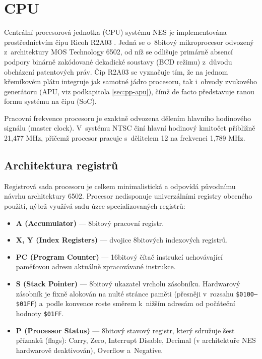 \section{CPU}

Centrální procesorová jednotka (CPU) systému NES je implementována prostřednictvím čipu Ricoh R2A03
. Jedná se o~8bitový mikroprocesor odvozený z~architektury MOS Technology 6502, od níž se odlišuje
primárně absencí podpory binárně zakódované dekadické soustavy (BCD režimu) z~důvodu obcházení
patentových práv. Čip R2A03 se vyznačuje tím, že na jednom křemíkovém plátu integruje jak samotné
jádro procesoru, tak i~obvody zvukového generátoru (APU, viz podkapitola \ref{sec:pp-apu}), čímž de
facto představuje ranou formu systému na čipu (SoC).

Pracovní frekvence procesoru je exaktně odvozena dělením hlavního hodinového signálu (master clock).
V~systému NTSC činí hlavní hodinový kmitočet přibližně 21,477 MHz, přičemž procesor pracuje
s~dělitelem 12 na frekvenci 1,789 MHz.

\subsection{Architektura registrů}

Registrová sada procesoru je celkem minimalistická a odpovídá původnímu návrhu architektury 6502.
Procesor nedisponuje univerzálními registry obecného použití, nýbrž využívá sadu úzce
specializovaných registrů:

\begin{itemize}
    \item \textbf{A (Accumulator)} — 8bitový pracovní registr.
    \item \textbf{X, Y (Index Registers)} — dvojice 8bitových indexových registrů.
    \item \textbf{PC (Program Counter)} — 16bitový čítač instrukcí uchovávající paměťovou adresu
        aktuálně zpracovávané instrukce.
    \item \textbf{S (Stack Pointer)} — 8bitový ukazatel vrcholu zásobníku. Hardwarový zásobník je
        fixně alokován na nulté stránce paměti (přesněji v~rozsahu \texttt{\$0100–\$01FF}) a~podle
        konvence roste směrem k~nižším adresám od počáteční hodnoty \texttt{\$01FF}.
    \item \textbf{P (Processor Status)} — 8bitový stavový registr, který sdružuje šest příznaků
        (flags): Carry, Zero, Interrupt Disable, Decimal (v architektuře NES hardwarově
        deaktivován), Overflow a~Negative.
\end{itemize}

